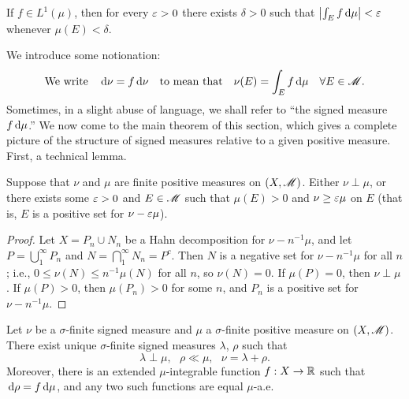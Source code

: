 \documentclass[12pt]{article} %
\begin{document}
\begin{corollary}\label{cor:3.6}
    If $f \in L^1(\mu)$, then for every $\varepsilon > 0$ there exists $\delta > 0$ such that $\left|\int_E f \, \mathrm{d} \mu\right| < \varepsilon$ whenever $\mu(E) < \delta$.
\end{corollary}

We introduce some notionation: \[\text{We write} \ \ \ \, \mathrm{d} \nu = f \, \mathrm{d} \nu \ \ \ \text{to mean that} \ \ \ \nu(E) = \int_E f \, \mathrm{d} \mu \ \ \ \forall E \in \mathscr{M}.\] Sometimes, in a slight abuse of language, we shall refer to ``the signed measure $f \, \mathrm{d} \mu$.'' We now come to the main theorem of this section, which gives a complete picture of the structure of signed measures relative to a given positive measure. First, a technical lemma.

\begin{lemma}\label{lem:radon-nikodym-technical}
    Suppose that $\nu$ and $\mu$ are finite positive measures on $(X, \mathscr{M})$. Either $\nu \perp \mu$, or there exists some $\varepsilon > 0$ and $E \in \mathscr{M}$ such that $\mu(E) > 0$ and $\nu \geq \varepsilon \mu$ on $E$ (that is, $E$ is a positive set for $\nu - \varepsilon \mu$).
\end{lemma}

\begin{proof}
    Let $X = P_n \cup N_n$ be a Hahn decomposition for $\nu - n^{-1}\mu$, and let $P = \bigcup_1^\infty P_n$ and $N = \bigcap_1^\infty N_n = P^c$. Then $N$ is a negative set for $\nu - n^{-1}\mu$ for all $n$; i.e., $0 \leq \nu(N) \leq n^{-1}\mu(N)$ for all $n$, so $\nu(N) = 0$. If $\mu(P) = 0$, then $\nu \perp \mu$. If $\mu(P) > 0$, then $\mu(P_n) > 0$ for some $n$, and $P_n$ is a positive set for $\nu - n^{-1}\mu$.
\end{proof}

\begin{theorem}\label{thm:radon-nikodym}
    Let $\nu$ be a $\sigma$-finite signed measure and $\mu$ a $\sigma$-finite positive measure on $(X, \mathscr{M})$. There exist unique $\sigma$-finite signed measures $\lambda$, $\rho$ such that \[\lambda \perp \mu, \ \ \ \rho \ll \mu, \ \ \ \nu = \lambda + \rho.\] Moreover, there is an extended $\mu$-integrable function $f : X \to \mathbb{R}$ such that $\, \mathrm{d} \rho = f \, \mathrm{d} \mu$, and any two such functions are equal $\mu$-a.e.
\end{theorem}
\end{document}
